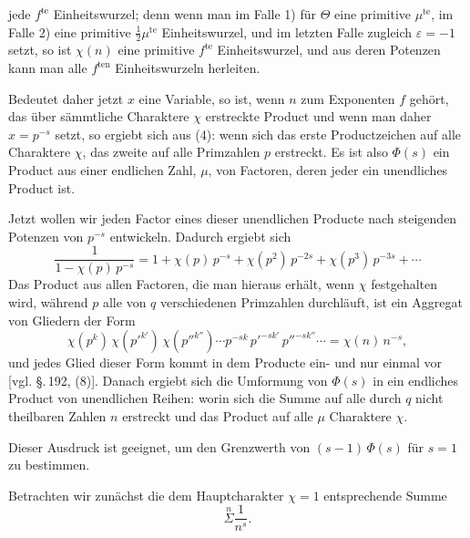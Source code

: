 jede $f^{\text{te}}$ Einheitswurzel; denn wenn man im Falle 1) für $\Theta$ eine
primitive $\mu^{\text{te}}$, im Falle 2) eine primitive $\frac{1}{2}\mu^{\text{te}}$
Einheitswurzel, und im letzten Falle zugleich $\varepsilon = -1$ setzt, so ist
$\chi(n)$ eine primitive $f^{\text{te}}$ Einheitswurzel, und aus deren Potenzen
kann man alle $f^{\text{ten}}$ Einheitswurzeln herleiten.

Bedeutet daher jetzt $x$ eine Variable, so ist, wenn $n$ zum Exponenten $f$
gehört, das über sämmtliche Charaktere $\chi$ erstreckte Product
und wenn man daher $x = p^{-s}$ setzt, so ergiebt sich aus (4):
wenn sich das erste Productzeichen auf alle Charaktere $\chi$, das zweite auf
alle Primzahlen $p$ erstreckt. Es ist also $\Phi(s)$ ein Product aus einer
endlichen Zahl, $\mu$, von Factoren, deren jeder ein unendliches Product ist.

Jetzt wollen wir jeden Factor eines dieser unendlichen Producte nach
steigenden Potenzen von $p^{-s}$ entwickeln. Dadurch ergiebt sich
\[
\frac{1}{1-\chi(p)\,p^{-s}} = 1 + \chi(p)\,p^{-s} + \chi(p^2)\,p^{-2s} + \chi(p^3)\,p^{-3s} + \cdots
\]
Das Product aus allen Factoren, die man hieraus erhält, wenn $\chi$
festgehalten wird, während $p$ alle von $q$ verschiedenen Primzahlen
durchläuft, ist ein Aggregat von Gliedern der Form
\[
\chi(p^k)\,\chi(p'^{k'})\,\chi(p''^{k''}) \cdots p^{-sk}\,p'^{-sk'}\,p''^{-sk''} \cdots = \chi(n)\,n^{-s},
\]
und jedes Glied dieser Form kommt in dem Producte ein- und nur einmal vor
[vgl. \S.\,192, (8)]. Danach ergiebt sich die Umformung von $\Phi(s)$ in ein
endliches Product von unendlichen Reihen:
worin sich die Summe auf alle durch $q$ nicht theilbaren Zahlen $n$ erstreckt
und das Product auf alle $\mu$ Charaktere $\chi$.

Dieser Ausdruck ist geeignet, um den Grenzwerth von $(s-1)\,\Phi(s)$ für
$s=1$ zu bestimmen.

Betrachten wir zunächst die dem Hauptcharakter $\chi = 1$ entsprechende
Summe
\[
\overset{n}{\Sigma} \frac{1}{n^s}.
\]
